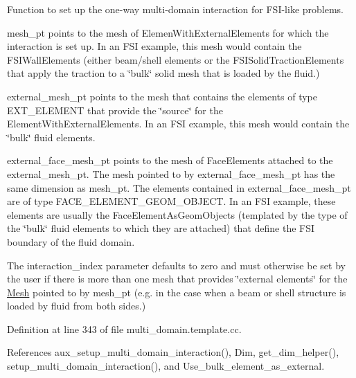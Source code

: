 Function to set up the one-\/way multi-\/domain interaction for F\+S\+I-\/like problems.
\begin{DoxyItemize}
\item {\ttfamily mesh\+\_\+pt} points to the mesh of {\ttfamily Elemen\+With\+External\+Elements} for which the interaction is set up. In an F\+SI example, this mesh would contain the {\ttfamily F\+S\+I\+Wall\+Elements} (either beam/shell elements or the {\ttfamily F\+S\+I\+Solid\+Traction\+Elements} that apply the traction to a \char`\"{}bulk\char`\"{} solid mesh that is loaded by the fluid.)
\item {\ttfamily external\+\_\+mesh\+\_\+pt} points to the mesh that contains the elements of type E\+X\+T\+\_\+\+E\+L\+E\+M\+E\+NT that provide the \char`\"{}source\char`\"{} for the {\ttfamily Element\+With\+External\+Elements}. In an F\+SI example, this mesh would contain the \char`\"{}bulk\char`\"{} fluid elements.
\item {\ttfamily external\+\_\+face\+\_\+mesh\+\_\+pt} points to the mesh of {\ttfamily Face\+Elements} attached to the {\ttfamily external\+\_\+mesh\+\_\+pt}. The mesh pointed to by {\ttfamily external\+\_\+face\+\_\+mesh\+\_\+pt} has the same dimension as {\ttfamily mesh\+\_\+pt}. The elements contained in {\ttfamily external\+\_\+face\+\_\+mesh\+\_\+pt} are of type F\+A\+C\+E\+\_\+\+E\+L\+E\+M\+E\+N\+T\+\_\+\+G\+E\+O\+M\+\_\+\+O\+B\+J\+E\+CT. In an F\+SI example, these elements are usually the {\ttfamily Face\+Element\+As\+Geom\+Objects} (templated by the type of the \char`\"{}bulk\char`\"{} fluid elements to which they are attached) that define the F\+SI boundary of the fluid domain.
\item The interaction\+\_\+index parameter defaults to zero and must otherwise be set by the user if there is more than one mesh that provides \char`\"{}external
  elements\char`\"{} for the \hyperlink{classoomph_1_1Mesh}{Mesh} pointed to by mesh\+\_\+pt (e.\+g. in the case when a beam or shell structure is loaded by fluid from both sides.) 
\end{DoxyItemize}

Definition at line 343 of file multi\+\_\+domain.\+template.\+cc.



References aux\+\_\+setup\+\_\+multi\+\_\+domain\+\_\+interaction(), Dim, get\+\_\+dim\+\_\+helper(), setup\+\_\+multi\+\_\+domain\+\_\+interaction(), and Use\+\_\+bulk\+\_\+element\+\_\+as\+\_\+external.

\mbox{\label{namespaceoomph_1_1Multi__domain__functions_abb2746a9c7ad6f5de84993e6284ef27b}} 
